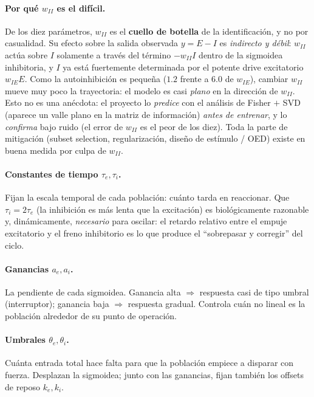 \documentclass[11pt,a4paper]{article}
\begin{document}
\paragraph{Por qué $w_{II}$ es el difícil.} De los diez parámetros, $w_{II}$ es el \textbf{cuello de botella} de la identificación, y no por casualidad. Su efecto sobre la salida observada $y=E-I$ es \emph{indirecto y débil}: $w_{II}$ actúa sobre $I$ solamente a través del término $-w_{II}I$ dentro de la sigmoidea inhibitoria, y $I$ ya está fuertemente determinada por el potente drive excitatorio $w_{IE}E$. Como la autoinhibición es pequeña ($1.2$ frente a $6.0$ de $w_{IE}$), cambiar $w_{II}$ mueve muy poco la trayectoria: el modelo es casi \emph{plano} en la dirección de $w_{II}$. Esto no es una anécdota: el proyecto lo \emph{predice} con el análisis de Fisher $+$ SVD (aparece un valle plano en la matriz de información) \emph{antes de entrenar}, y lo \emph{confirma} bajo ruido (el error de $w_{II}$ es el peor de los diez). Toda la parte de mitigación (subset selection, regularización, diseño de estímulo / OED) existe en buena medida por culpa de $w_{II}$.

\paragraph{Constantes de tiempo $\tau_e,\tau_i$.} Fijan la escala temporal de cada población: cuánto tarda en reaccionar. Que $\tau_i=2\tau_e$ (la inhibición es más lenta que la excitación) es biológicamente razonable y, dinámicamente, \emph{necesario} para oscilar: el retardo relativo entre el empuje excitatorio y el freno inhibitorio es lo que produce el ``sobrepasar y corregir'' del ciclo.

\paragraph{Ganancias $a_e,a_i$.} La pendiente de cada sigmoidea. Ganancia alta $\Rightarrow$ respuesta casi de tipo umbral (interruptor); ganancia baja $\Rightarrow$ respuesta gradual. Controla cuán no lineal es la población alrededor de su punto de operación.

\paragraph{Umbrales $\theta_e,\theta_i$.} Cuánta entrada total hace falta para que la población empiece a disparar con fuerza. Desplazan la sigmoidea; junto con las ganancias, fijan también los offsets de reposo $k_e,k_i$.
\end{document}

